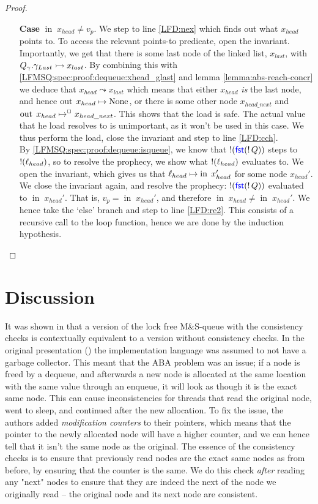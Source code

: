 \documentclass[a4paper, 11pt]{report}
\newcommand{\nIn}[1]{\operatorname{in} \; #1}
\newcommand{\nOut}[1]{\operatorname{out} \; #1}
\newcommand{\Qg}{Q_\gname}
\newcommand{\reach}[2]{#1 \leadsto #2}
\newcommand{\ap}[2]{#1 \rightarrowtail #2}
\begin{document}
\begin{proof}
\begin{itemize}
    \item[\textbf{Case}] $\nIn{x_{head}} \neq v_p$.
    We step to line \ref{LFD:nex} which finds out what $x_{head}$ points to. To access the relevant points-to predicate, open the invariant. Importantly, we get that there is some last node of the linked list, $x_{last}$, with $\ap{\Qg.\gname_{Last}}{x_{last}}$. By combining this with \ref{LFMSQ:spec:proof:dequeue:xhead_glast} and lemma \ref{lemma:abs-reach-concr} we deduce that $\reach{x_{head}}{x_{last}}$ which means that either $x_{head}$ \textit{is} the last node, and hence $\nOut{x_{head}} \mapsto \None$, or there is some other node $x_{head\_next}$ and $\nOut{x_{head}} \mapsto^{\persistently} x_{head\_next}$. This shows that the load is safe. The actual value that he load resolves to is unimportant, as it won't be used in this case. We thus perform the load, close the invariant and step to line \ref{LFD:cch}.\\
    By \ref{LFMSQ:spec:proof:dequeue:isqueue}, we know that $\mathop{!}(\operatorname{\textsf{\color{blue} fst}} (\mathop{!} Q))$ steps to $\mathop{!}(\ell_{head})$, so to resolve the prophecy, we show what $\mathop{!}(\ell_{head})$ evaluates to. We open the invariant, which gives us that $\loc_{head} \mapsto \nIn{x_{head}'}$ for some node $x_{head}'$. We close the invariant again, and resolve the prophecy: $\mathop{!}(\operatorname{\textsf{\color{blue} fst}} (\mathop{!} Q))$ evaluated to $\nIn{x_{head}'}$. That is, $v_p = \nIn{x_{head}'}$, and therefore $\nIn{x_{head}} \neq \nIn{x_{head}'}$. We hence take the `else' branch and step to line \ref{LFD:re2}. This consists of a recursive call to the loop function, hence we are done by the induction hypothesis.
  \end{itemize}
\end{proof}


\section{Discussion}
\label{LFMSQ:section:discussion}

It was shown in \cite{DBLP:conf/cpp/VindumB21} that a version of the lock free M\&S-queue with the consistency checks is contextually equivalent to a version without consistency checks. In the original presentation (\cite{DBLP:conf/podc/MichaelS96}) the implementation language was assumed to not have a garbage collector. This meant that the ABA problem was an issue; if a node is freed by a dequeue, and afterwards a new node is allocated at the same location with the same value through an enqueue, it will look as though it is the exact same node. This can cause inconsistencies for threads that read the original node, went to sleep, and continued after the new allocation. 
To fix the issue, the authors added \textit{modification counters} to their pointers, which means that the pointer to the newly allocated node will have a higher counter, and we can hence tell that it isn't the same node as the original. The essence of the consistency checks is to ensure that previously read nodes are the exact same nodes as from before, by ensuring that the counter is the same.
We do this check \textit{after} reading any "next" nodes to ensure that they are indeed the next of the node we originally read -- the original node and its next node are consistent.
\end{document}
